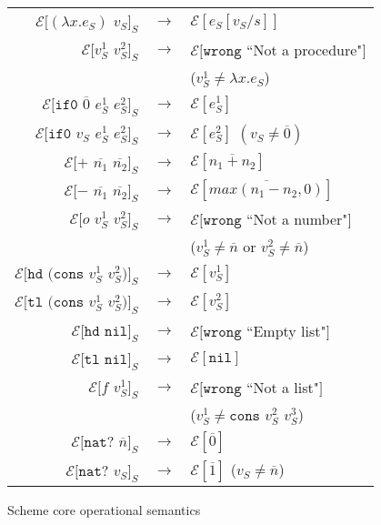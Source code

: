 \begin{figure}
\label{scos}
\caption{Scheme core operational semantics}
\begin{center}
\begin{tabular}{rcl}
$\mathscr{E}[(\lambda x.e_{S})$ $v_{S}]_{S}$ & $\rightarrow$ & $\mathscr{E}[e_{S}[v_{S}/s]]$ \\
$\mathscr{E}[v_{S}^{1}$ $v_{S}^{2}]_{S}$ & $\rightarrow$ & $\mathscr{E}[\mathtt{wrong}$ ``Not a procedure"$]$ \\
&& ($v_{S}^{1}\neq\lambda x.e_{S}$) \\
$\mathscr{E}[\mathtt{if0}$ $\overline{0}$ $e_{S}^{1}$ $e_{S}^{2}]_{S}$ & $\rightarrow$ & $\mathscr{E}[e_{S}^{1}]$ \\
$\mathscr{E}[\mathtt{if0}$ $v_{S}$ $e_{S}^{1}$ $e_{S}^{2}]_{S}$ & $\rightarrow$ & $\mathscr{E}[e_{S}^{2}]$ $(v_{S}\neq\overline{0})$ \\
$\mathscr{E}[+$ $\overline{n_{1}}$ $\overline{n_{2}}]_{S}$ & $\rightarrow$ & $\mathscr{E}[\overline{n_{1}+n_{2}}]$ \\
$\mathscr{E}[-$ $\overline{n_{1}}$ $\overline{n_{2}}]_{S}$ & $\rightarrow$ & $\mathscr{E}[\overline{max(n_{1}-n_{2},0)}]$ \\
$\mathscr{E}[o$ $v_{S}^{1}$ $v_{S}^{2}]_{S}$ & $\rightarrow$ & $\mathscr{E}[\mathtt{wrong}$ ``Not a number"$]$ \\
&& ($v_{S}^{1}\neq\overline{n}$ or $v_{S}^{2}\neq\overline{n}$) \\
$\mathscr{E}[\mathtt{hd}$ $(\mathtt{cons}$ $v_{S}^{1}$ $v_{S}^{2})]_{S}$ & $\rightarrow$ & $\mathscr{E}[v_{S}^{1}]$ \\
$\mathscr{E}[\mathtt{tl}$ $(\mathtt{cons}$ $v_{S}^{1}$ $v_{S}^{2})]_{S}$ & $\rightarrow$ & $\mathscr{E}[v_{S}^{2}]$ \\
$\mathscr{E}[\mathtt{hd}$ $\mathtt{nil}]_{S}$ & $\rightarrow$ & $\mathscr{E}[\mathtt{wrong}$ ``Empty list"$]$ \\
$\mathscr{E}[\mathtt{tl}$ $\mathtt{nil}]_{S}$ & $\rightarrow$ & $\mathscr{E}[\mathtt{nil}]$ \\
$\mathscr{E}[f$ $v_{S}^{1}]_{S}$ & $\rightarrow$ & $\mathscr{E}[\mathtt{wrong}$ ``Not a list"$]$ \\
&& ($v_{S}^{1}\neq\mathtt{cons}$ $v_{S}^{2}$ $v_{S}^{3}$) \\
$\mathscr{E}[\mathtt{nat?}$ $\overline{n}]_{S}$ & $\rightarrow$ & $\mathscr{E}[\overline{0}]$ \\
$\mathscr{E}[\mathtt{nat?}$ $v_{S}]_{S}$ & $\rightarrow$ & $\mathscr{E}[\overline{1}]$ ($v_{S}\neq\overline{n}$) \\

\end{tabular}
\end{center}
\end{figure}
